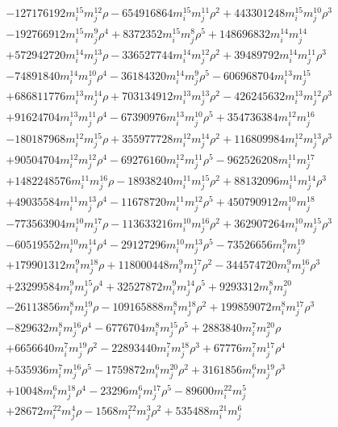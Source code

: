 {\begin{align*}
&-127176192m_i^{15}m_j^{12}\rho-654916864m_i^{15}m_j^{11}\rho^{2}+443301248m_i^{15}m_j^{10}\rho^{3}\\
&-192766912m_i^{15}m_j^{9}\rho^{4}+8372352m_i^{15}m_j^{8}\rho^{5}+148696832m_i^{14}m_j^{14}\\
&+572942720m_i^{14}m_j^{13}\rho-336527744m_i^{14}m_j^{12}\rho^{2}+39489792m_i^{14}m_j^{11}\rho^{3}\\
&-74891840m_i^{14}m_j^{10}\rho^{4}-36184320m_i^{14}m_j^{9}\rho^{5}-606968704m_i^{13}m_j^{15}\\
&+686811776m_i^{13}m_j^{14}\rho+703134912m_i^{13}m_j^{13}\rho^{2}-426245632m_i^{13}m_j^{12}\rho^{3}\\
&+91624704m_i^{13}m_j^{11}\rho^{4}-67390976m_i^{13}m_j^{10}\rho^{5}+354736384m_i^{12}m_j^{16}\\
&-180187968m_i^{12}m_j^{15}\rho+355977728m_i^{12}m_j^{14}\rho^{2}+116809984m_i^{12}m_j^{13}\rho^{3}\\
&+90504704m_i^{12}m_j^{12}\rho^{4}-69276160m_i^{12}m_j^{11}\rho^{5}-962526208m_i^{11}m_j^{17}\\
&+1482248576m_i^{11}m_j^{16}\rho-18938240m_i^{11}m_j^{15}\rho^{2}+88132096m_i^{11}m_j^{14}\rho^{3}\\
&+49035584m_i^{11}m_j^{13}\rho^{4}-11678720m_i^{11}m_j^{12}\rho^{5}+450790912m_i^{10}m_j^{18}\\
&-773563904m_i^{10}m_j^{17}\rho-113633216m_i^{10}m_j^{16}\rho^{2}+362907264m_i^{10}m_j^{15}\rho^{3}\\
&-60519552m_i^{10}m_j^{14}\rho^{4}-29127296m_i^{10}m_j^{13}\rho^{5}-73526656m_i^{9}m_j^{19}\\
&+179901312m_i^{9}m_j^{18}\rho+118000448m_i^{9}m_j^{17}\rho^{2}-344574720m_i^{9}m_j^{16}\rho^{3}\\
&+23299584m_i^{9}m_j^{15}\rho^{4}+32527872m_i^{9}m_j^{14}\rho^{5}+9293312m_i^{8}m_j^{20}\\
&-26113856m_i^{8}m_j^{19}\rho-109165888m_i^{8}m_j^{18}\rho^{2}+199859072m_i^{8}m_j^{17}\rho^{3}\\
&-829632m_i^{8}m_j^{16}\rho^{4}-6776704m_i^{8}m_j^{15}\rho^{5}+2883840m_i^{7}m_j^{20}\rho\\
&+6656640m_i^{7}m_j^{19}\rho^{2}-22893440m_i^{7}m_j^{18}\rho^{3}+67776m_i^{7}m_j^{17}\rho^{4}\\
&+535936m_i^{7}m_j^{16}\rho^{5}-1759872m_i^{6}m_j^{20}\rho^{2}+3161856m_i^{6}m_j^{19}\rho^{3}\\
&+10048m_i^{6}m_j^{18}\rho^{4}-23296m_i^{6}m_j^{17}\rho^{5}-89600m_i^{22}m_j^{5}\\
&+28672m_i^{22}m_j^{4}\rho-1568m_i^{22}m_j^{3}\rho^{2}+535488m_i^{21}m_j^{6}\\

\end{align*}}
